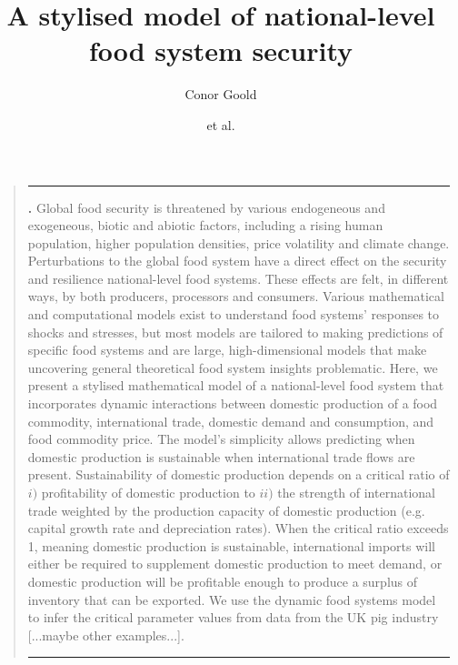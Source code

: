 \documentclass[12pt]{article}
\title{A stylised model of national-level food system security}
\author[1]{Conor Goold}
\affil[1]{Faculty of Biological Sciences, University of Leeds, LS2 9JT, UK}
\author{et al.}
\date{}
\renewenvironment{abstract}
{\begin{quote}
\small
\noindent \rule{\linewidth}{.5pt}\par{\bfseries \abstractname.}}
{\medskip\noindent \rule{\linewidth}{.5pt}
\end{quote}
}
\begin{document}
\linenumbers
\modulolinenumbers[5]

\maketitle
\begin{abstract}
  Global food security is threatened by various endogeneous and exogeneous, biotic and abiotic factors, including a rising human population, higher population densities, price volatility and climate change. Perturbations to the global food system have a direct effect on the security and resilience national-level food systems. These effects are felt, in different ways, by both producers, processors and consumers. Various mathematical and computational models exist to understand food systems' responses to shocks and stresses, but most models are tailored to making predictions of specific food systems and are large, high-dimensional models that make uncovering general theoretical food system insights problematic. Here, we present a stylised mathematical model of a national-level food system that incorporates dynamic interactions between domestic production of a food commodity, international trade, domestic demand and consumption, and food commodity price. The model's simplicity allows predicting when domestic production is sustainable when international trade flows are present. Sustainability of domestic production depends on a critical ratio of $i)$ profitability of domestic production to $ii)$ the strength of international trade weighted by the production capacity of domestic production (e.g. capital growth rate and depreciation rates). When the critical ratio exceeds 1, meaning domestic production is sustainable, international imports will either be required to supplement domestic production to meet demand, or domestic production will be profitable enough to produce a surplus of inventory that can be exported. We use the dynamic food systems model to infer the critical parameter values from data from the UK pig industry [...maybe other examples...].\\
\end{abstract}

\newpage
\tableofcontents
\end{document}
